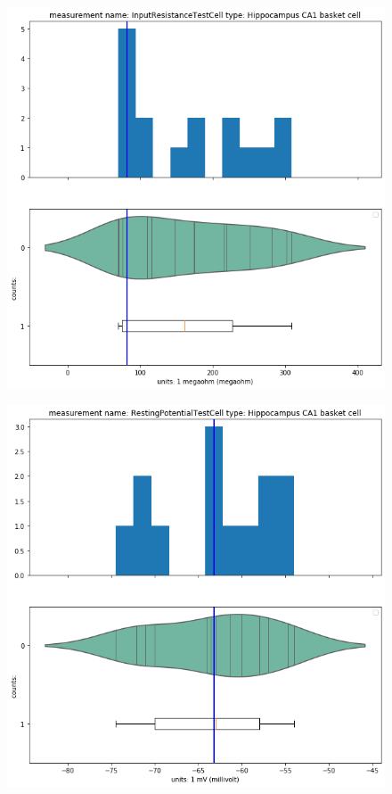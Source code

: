 \begin{figure}
\centering
   \includegraphics[scale=0.45]{notebooks_converted/needata_thesis_files/needata_thesis_5_5}
\end{figure}

%
\begin{figure}
\centering
  \includegraphics[scale=0.45]{notebooks_converted/needata_thesis_files/needata_thesis_5_6}
\end{figure}

